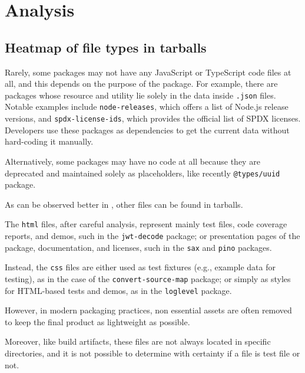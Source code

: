 \chapter{Analysis}
\label{ch:analysis}

\section{Heatmap of file types in tarballs}
\label{sec:realWorldAnalysisFileTypes}

Rarely, some packages may not have any JavaScript or TypeScript code files at all, 
and this depends on the purpose of the package.
For example, there are packages whose resource and utility lie solely in the data inside \texttt{.json} files.
Notable examples include \texttt{node-\allowbreak releases}, which offers a list of Node.js release versions, 
and \texttt{spdx-\allowbreak license-\allowbreak ids}, which provides the official list of \ac{SPDX} licenses. 
Developers use these packages as dependencies to get the current data without hard-coding it manually.

Alternatively, some packages may have no code at all because they are deprecated and maintained solely as placeholders, 
like recently \texttt{@types/\allowbreak uuid} package.


As can be observed better in , other files can be found in tarballs.

The \texttt{html} files, after careful analysis,
represent mainly test files, code coverage reports, and demos, such in the \texttt{jwt-decode} package;
or presentation pages of the package, documentation, and licenses, such in the \texttt{sax} and \texttt{pino} packages.

Instead, the \texttt{css} files are either used as test fixtures (e.g., example data for testing), 
as in the case of the \texttt{convert-source-map} package;
or simply as styles for HTML-based tests and demos, as in the \texttt{loglevel} package.

However, in modern packaging practices,
non essential assets are often removed to keep the final product as lightweight as possible.

Moreover, like build artifacts, these files are not always located in specific directories,
and it is not possible to determine with certainty if a file is test file or not.


